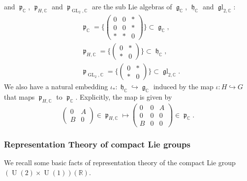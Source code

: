 \documentclass[11pt, a4paper]{amsart}
\theoremstyle{plain}
\theoremstyle{definition}
\numberwithin{equation}{section}
\def\CC{\mathbb{C}}
\def\RR{\mathbb{R}}
\DeclareMathOperator{\GL}{\mathrm{GL}}
\DeclareMathOperator{\U}{\mathrm{U}}
\DeclareMathOperator{\lieg}{\mathfrak g}
\DeclareMathOperator{\lieh}{\mathfrak h}
\DeclareMathOperator{\liep}{\mathfrak p}
\DeclareMathOperator{\liegl}{\mathfrak gl}
\begin{document}
and $\liep_{\CC}$, $\liep_{H, \CC}$ and $\liep_{\GL_{2}, \CC}$ are the sub Lie algebras of $\lieg_{\CC}$, $\lieh_{\CC}$ and $\liegl_{2, \CC}$: 
\begin{align*}
    & \liep_{\CC} = \{\begin{pmatrix}
                    0 & 0 & * \\
                    0 & 0 & * \\
                    * & * & 0 
                  \end{pmatrix}\} \subset \lieg_{\CC}, \\ 
    & \liep_{H, \CC} = \{\begin{pmatrix}
                            0 & * \\
                            * & 0 
                        \end{pmatrix}\} \subset \lieh_{\CC}, \\
    & \liep_{\GL_{2}, \CC} = \{\begin{pmatrix}
                            0 & * \\
                            * & 0 
                        \end{pmatrix}\} \subset \liegl_{2, \CC}. 
\end{align*}
We also have a natural embedding $\iota_{*} \colon \lieh_{\CC} \hookrightarrow \lieg_{\CC}$ induced by the map $\iota \colon H \hookrightarrow G$ that maps $\liep_{H, \CC}$ to $\liep_{\CC}$. Explicitly, the map is given by 
\begin{equation*}
    \begin{pmatrix}
            0 & A \\
            B & 0 
    \end{pmatrix} \in  \liep_{H, \CC}  \mapsto \begin{pmatrix}
                                                    0 & 0 & A \\
                                                    0 & 0 & 0 \\
                                                    B & 0 & 0 
                                                \end{pmatrix} \in \liep_{\CC}. 
\end{equation*}

\subsubsection{Representation Theory of compact Lie groups}
\label{SSS: repn of compact Lie group}
We recall some basic facts of representation theory of the compact Lie group $(\U(2) \times \U(1))(\RR)$.
\end{document}
